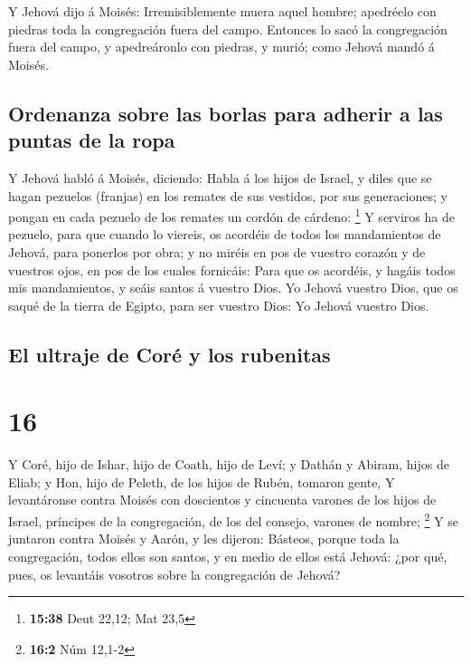  Y Jehová dijo á Moisés: Irremisiblemente muera aquel
hombre; apedréelo con piedras toda la congregación fuera del campo.
 Entonces lo sacó la congregación fuera del campo, y
apedreáronlo con piedras, y murió; como Jehová mandó á Moisés.

\hypertarget{ordenanza-sobre-las-borlas-para-adherir-a-las-puntas-de-la-ropa}{%
\subsection{Ordenanza sobre las borlas para adherir a las puntas de la
ropa}\label{ordenanza-sobre-las-borlas-para-adherir-a-las-puntas-de-la-ropa}}

 Y Jehová habló á Moisés, diciendo:  Habla
á los hijos de Israel, y diles que se hagan pezuelos (franjas) en los
remates de sus vestidos, por sus generaciones; y pongan en cada pezuelo
de los remates un cordón de cárdeno: \footnote{\textbf{15:38} Deut
  22,12; Mat 23,5}  Y serviros ha de pezuelo, para que
cuando lo viereis, os acordéis de todos los mandamientos de Jehová, para
ponerlos por obra; y no miréis en pos de vuestro corazón y de vuestros
ojos, en pos de los cuales fornicáis:  Para que os
acordéis, y hagáis todos mis mandamientos, y seáis santos á vuestro
Dios.  Yo Jehová vuestro Dios, que os saqué de la tierra
de Egipto, para ser vuestro Dios: Yo Jehová vuestro Dios.

\hypertarget{el-ultraje-de-coruxe9-y-los-rubenitas}{%
\subsection{El ultraje de Coré y los
rubenitas}\label{el-ultraje-de-coruxe9-y-los-rubenitas}}

\hypertarget{section-15}{%
\section{16}\label{section-15}}

 Y Coré, hijo de Ishar, hijo de Coath, hijo de Leví; y
Dathán y Abiram, hijos de Eliab; y Hon, hijo de Peleth, de los hijos de
Rubén, tomaron gente,  Y levantáronse contra Moisés con
doscientos y cincuenta varones de los hijos de Israel, príncipes de la
congregación, de los del consejo, varones de nombre; \footnote{\textbf{16:2}
  Núm 12,1-2}  Y se juntaron contra Moisés y Aarón, y les
dijeron: Básteos, porque toda la congregación, todos ellos son santos, y
en medio de ellos está Jehová: ¿por qué, pues, os levantáis vosotros
sobre la congregación de Jehová?

